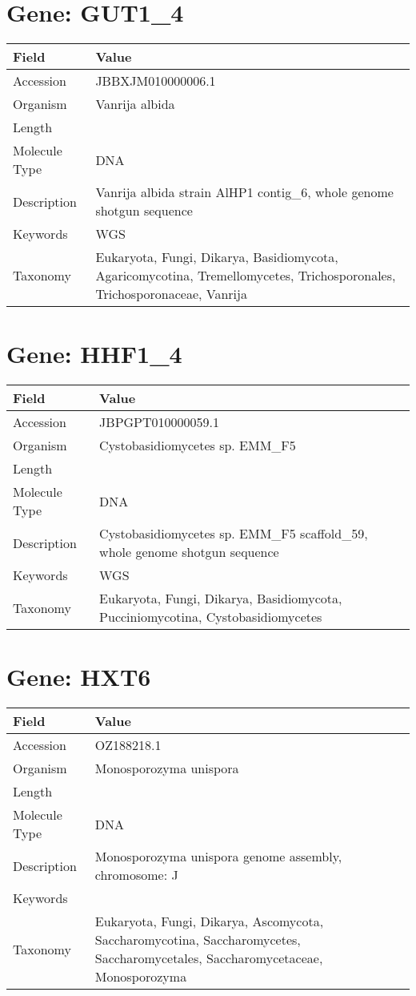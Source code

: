 \documentclass[10pt]{article}
\begin{document}
\section*{Gene: GUT1\_4}
{\footnotesize
\begin{longtable}{>{\raggedright\arraybackslash}p{4.5cm} >{\raggedright\arraybackslash}p{11.5cm}}
\textbf{Field} & \textbf{Value} \\
\hline
Accession & JBBXJM010000006.1 \\
Organism & Vanrija albida \\
Length & 2511085 \\
Molecule Type & DNA \\
Description & Vanrija albida strain AlHP1 contig\_6, whole genome shotgun sequence \\
Keywords & WGS \\
Taxonomy & Eukaryota, Fungi, Dikarya, Basidiomycota, Agaricomycotina, Tremellomycetes, Trichosporonales, Trichosporonaceae, Vanrija \\
\end{longtable}
}


\section*{Gene: HHF1\_4}
{\footnotesize
\begin{longtable}{>{\raggedright\arraybackslash}p{4.5cm} >{\raggedright\arraybackslash}p{11.5cm}}
\textbf{Field} & \textbf{Value} \\
\hline
Accession & JBPGPT010000059.1 \\
Organism & Cystobasidiomycetes sp. EMM\_F5 \\
Length & 52126 \\
Molecule Type & DNA \\
Description & Cystobasidiomycetes sp. EMM\_F5 scaffold\_59, whole genome shotgun sequence \\
Keywords & WGS \\
Taxonomy & Eukaryota, Fungi, Dikarya, Basidiomycota, Pucciniomycotina, Cystobasidiomycetes \\
\end{longtable}
}


\section*{Gene: HXT6}
{\footnotesize
\begin{longtable}{>{\raggedright\arraybackslash}p{4.5cm} >{\raggedright\arraybackslash}p{11.5cm}}
\textbf{Field} & \textbf{Value} \\
\hline
Accession & OZ188218.1 \\
Organism & Monosporozyma unispora \\
Length & 919729 \\
Molecule Type & DNA \\
Description & Monosporozyma unispora genome assembly, chromosome: J \\
Keywords &  \\
Taxonomy & Eukaryota, Fungi, Dikarya, Ascomycota, Saccharomycotina, Saccharomycetes, Saccharomycetales, Saccharomycetaceae, Monosporozyma \\
\end{longtable}
}
\end{document}
